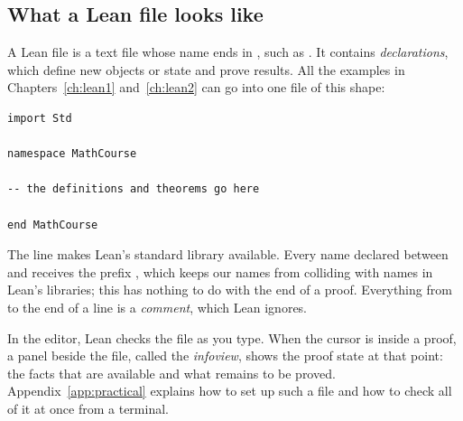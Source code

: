 \subsection*{What a Lean file looks like}
A Lean file is a text file whose name ends in , such as . It contains \emph{declarations}, which define new objects or state and prove results. All the examples in Chapters~\ref{ch:lean1} and~\ref{ch:lean2} can go into one file of this shape:
\par\noindent\begin{minipage}{\linewidth}
\begin{lstlisting}
import Std

namespace MathCourse

-- the definitions and theorems go here

end MathCourse
\end{lstlisting}
\end{minipage}\par
The line  makes Lean's standard library available. Every name declared between  and  receives the prefix , which keeps our names from colliding with names in Lean's libraries; this  has nothing to do with the end of a proof. Everything from \code{-{}-} to the end of a line is a \emph{comment}, which Lean ignores.

In the editor, Lean checks the file as you type. When the cursor is inside a proof, a panel beside the file, called the \emph{infoview}, shows the proof state at that point: the facts that are available and what remains to be proved. Appendix~\ref{app:practical} explains how to set up such a file and how to check all of it at once from a terminal.

